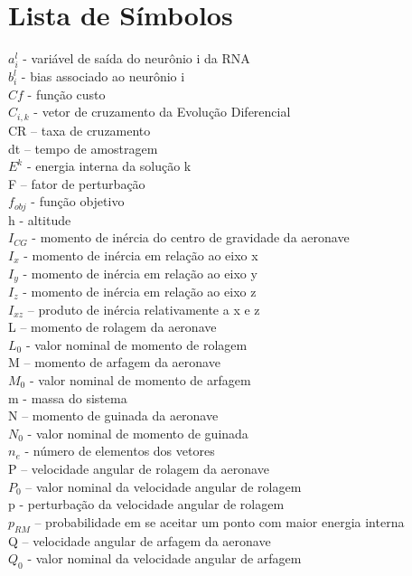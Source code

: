 \documentclass[10pt,a4paper]{article}
\numberwithin{equation}{section}
\begin{document}
\section*{Lista de Símbolos}

\noindent $a_i^l$  - variável de saída do neurônio i da RNA\\
$b_i^l$ - bias associado ao neurônio i\\
$Cf$ - função custo\\
$C_{i,k}$ - vetor de cruzamento da Evolução Diferencial \\
CR – taxa de cruzamento\\
dt – tempo de amostragem \\
$E^k$  - energia interna da solução k\\
F – fator de perturbação\\
$f_{obj}$ - função objetivo\\
h  - altitude\\
$I_{CG}$ - momento de inércia do centro de gravidade da aeronave\\
$I_x$  - momento de inércia em relação ao eixo x\\
$I_y$ - momento de inércia em relação ao eixo y\\
$I_z$ - momento de inércia em relação ao eixo z\\
$I_{xz}$ – produto de inércia relativamente a x e z\\
L – momento de rolagem da aeronave\\
$L_0$ - valor nominal de momento de rolagem\\
M – momento de arfagem da aeronave\\
$M_0$ - valor nominal de momento de arfagem\\
m - massa do sistema\\
N – momento de guinada da aeronave\\
$N_0$ - valor nominal de momento de guinada\\
$n_e$ - número de elementos dos vetores\\
P – velocidade angular de rolagem da aeronave\\
$P_0$ – valor nominal da velocidade angular de rolagem\\
p - perturbação da velocidade angular de rolagem\\
$p_{RM}$ – probabilidade em se aceitar um ponto com maior energia interna\\
Q – velocidade angular de arfagem da aeronave\\
$Q_0$ - valor nominal da velocidade angular de arfagem\\
\end{document}
